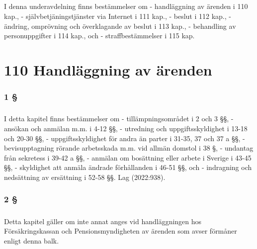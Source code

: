 \documentclass[a4paper,notitlepage,openany,10pt]{book}
\begin{document}
\paragraph*{}
I denna underavdelning finns bestämmelser om
\newline - handläggning av ärenden i 110 kap., - självbetjäningstjänster via Internet i 111 kap.,
\newline - beslut i 112 kap.,
\newline - ändring, omprövning och överklagande av beslut i 113 kap.,
\newline - behandling av personuppgifter i 114 kap., och
\newline - straffbestämmelser i 115 kap.
\chapter*{110 Handläggning av ärenden}
\subsection*{1 §}
\paragraph*{}
I detta kapitel finns bestämmelser om
\newline - tillämpningsområdet i 2 och 3 §§,
\newline - ansökan och anmälan m.m. i 4-12 §§,
\newline - utredning och uppgiftsskyldighet i 13-18 och 20-30 §§,
\newline - uppgiftsskyldighet för andra än parter i 31-35, 37 och 37 a §§,
\newline - bevisupptagning rörande arbetsskada m.m. vid allmän domstol i 38 §,
\newline - undantag från sekretess i 39-42 a §§,
\newline - anmälan om bosättning eller arbete i Sverige i 43-45 §§,
\newline - skyldighet att anmäla ändrade förhållanden i 46-51 §§, och
\newline - indragning och nedsättning av ersättning i 52-58 §§.
Lag (2022:938).
\subsection*{2 §}
\paragraph*{}
Detta kapitel gäller om inte annat anges vid handläggningen hos Försäkringskassan och Pensionsmyndigheten av ärenden som avser förmåner enligt denna balk.
\end{document}
